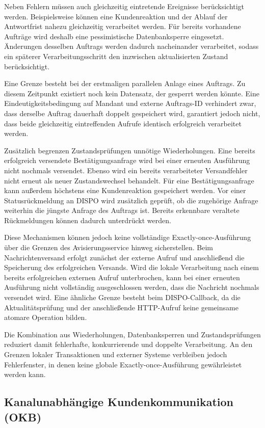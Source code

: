 Neben Fehlern müssen auch gleichzeitig eintretende Ereignisse berücksichtigt
werden. Beispielsweise können eine Kundenreaktion und der Ablauf der
Antwortfrist nahezu gleichzeitig verarbeitet werden. Für bereits vorhandene
Aufträge wird deshalb eine pessimistische Datenbanksperre eingesetzt.
Änderungen desselben Auftrags werden dadurch nacheinander verarbeitet, sodass
ein späterer Verarbeitungsschritt den inzwischen aktualisierten Zustand
berücksichtigt.

Eine Grenze besteht bei der erstmaligen parallelen Anlage eines Auftrags. Zu
diesem Zeitpunkt existiert noch kein Datensatz, der gesperrt werden könnte.
Eine Eindeutigkeitsbedingung auf Mandant und externe Auftrags-ID verhindert
zwar, dass derselbe Auftrag dauerhaft doppelt gespeichert wird, garantiert
jedoch nicht, dass beide gleichzeitig eintreffenden Aufrufe identisch
erfolgreich verarbeitet werden.

Zusätzlich begrenzen Zustandsprüfungen unnötige Wiederholungen. Eine bereits
erfolgreich versendete Bestätigungsanfrage wird bei einer erneuten
Ausführung nicht nochmals versendet. Ebenso wird ein bereits verarbeiteter
Versandfehler nicht erneut als neuer Zustandswechsel behandelt. Für eine
Bestätigungsanfrage kann außerdem höchstens eine Kundenreaktion gespeichert
werden. Vor einer Statusrückmeldung an DISPO wird zusätzlich geprüft, ob die
zugehörige Anfrage weiterhin die jüngste Anfrage des Auftrags ist. Bereits
erkennbare veraltete Rückmeldungen können dadurch unterdrückt werden.

Diese Mechanismen können jedoch keine vollständige Exactly-once-Ausführung über
die Grenzen des Avisierungsservice hinweg sicherstellen. Beim
Nachrichtenversand erfolgt zunächst der externe Aufruf und anschließend die
Speicherung des erfolgreichen Versands. Wird die lokale Verarbeitung nach
einem bereits erfolgreichen externen Aufruf unterbrochen, kann bei einer
erneuten Ausführung nicht vollständig ausgeschlossen werden, dass die Nachricht
nochmals versendet wird. Eine ähnliche Grenze besteht beim DISPO-Callback, da
die Aktualitätsprüfung und der anschließende HTTP-Aufruf keine gemeinsame
atomare Operation bilden.

Die Kombination aus Wiederholungen, Datenbanksperren und Zustandsprüfungen
reduziert damit fehlerhafte, konkurrierende und doppelte Verarbeitung. An den
Grenzen lokaler Transaktionen und externer Systeme verbleiben jedoch
Fehlerfenster, in denen keine globale Exactly-once-Ausführung gewährleistet
werden kann.

\subsection{Kanalunabhängige Kundenkommunikation (OKB)}
\label{sec:kundenkommunikation}

